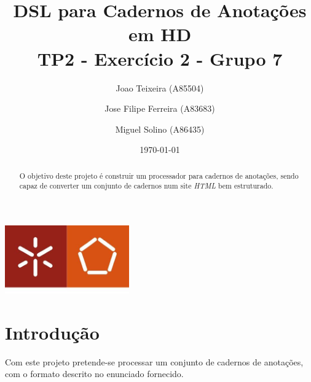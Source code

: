 \documentclass[a4paper]{report}
\begin{document}
\title{DSL para Cadernos de Anotações em HD \\
\large TP2 - Exercício 2 - Grupo 7}
\author{Joao Teixeira (A85504) \and Jose Filipe Ferreira (A83683) \and Miguel
Solino (A86435)}
\date{\today}

\begin{center}
    \begin{minipage}{0.75\linewidth}
        \centering
        \includegraphics[width=0.4\textwidth]{eng.jpeg}\par\vspace{1cm}
        \vspace{1.5cm}
        \href{https://www.uminho.pt/PT}
        {\color{black}{\scshape\LARGE Universidade do Minho}} \par
        \vspace{1cm}
        \href{https://www.di.uminho.pt/}
        {\color{black}{\scshape\Large Departamento de Informática}} \par
        \vspace{1.5cm}
        \maketitle
    \end{minipage}
\end{center}

\begin{abstract}
    \begin{center}
        O objetivo deste projeto é construir um processador para cadernos de
        anotações, sendo capaz de converter um conjunto de cadernos num 
        site \textit{HTML} bem estruturado.
    \end{center}
\end{abstract}

\tableofcontents

\pagebreak

\chapter{Introdução}
Com este projeto pretende-se processar um conjunto de cadernos de anotações, com
o formato descrito no enunciado fornecido.
\end{document}
